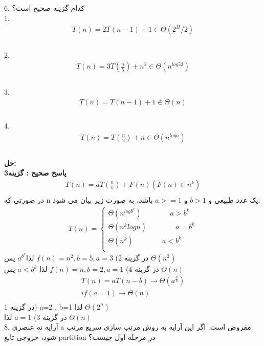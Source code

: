 \documentclass{book}
\begin{document}
6. کدام گزینه صحیح است؟ \\
1.\begin{align*}
T(n) =2T(n-1) + 1 \in \Theta (2^{\Pi}/2) \\
    \end{align*}
    \\
2.\begin{align*}
T(n) =3T(\frac{n}{5}) + n^2 \in \Theta (n^{log53}) \\
\end{align*}
\\
3.\begin{align*}
T(n) =T(n-1) + 1 \in \Theta (n) \\
\end{align*}
\\
4.\begin{align*}
T(n) =T(\frac{n}{2}) + n \in \Theta (n^{log n}) \\
\end{align*}
\\
\textbf{حل:}\\
\textbf{پاسخ صحیح : گزینه3}\\
\begin{align*}
T(n)=aT(\frac{n}{b})+F(n) (F(n) \in n^k)\\
\end{align*}
در صورتی که n یک عدد طبیعی و $b>1$ و $a>=1$ باشد، به صورت زیر بیان می شود:\\
\begin{align*}
T(n) =\begin{cases}
\Theta (n^{log b^a}) \quad\quad\quad\quad a > b^k\\
\Theta (n^k log n) \quad\quad\quad\quad a = b^k\\
\Theta (n^k) \quad\quad\quad\quad a < b^k\\
\end{cases}
\end{align*}
در گزینه 2) $f(n)=n^2, b=5,a=3$  لذا$a^b^k$ پس $\Theta (n^2)$\\
در گزینه 4) $f(n)=n , b=2,a=1$ لذا $a<b^k$ پس $\Theta (n)$\\
\begin{align*}
T(n)=aT(n-b)  \rightarrow \Theta (a^{\frac{n}{b}}) \\
if (a=1) \rightarrow \Theta (n) \\
\end{align*}
در گزینه 1) a=2 , b=1 لذا $\Theta(2^n)$\\ 
در گزینه 3) 
$a=1$ لذا $\Theta(n)$\\
8. آرایه نه عنصری a مفروض است. اگر این آرایه به روش مرتب سازی سریع مرتب شود، خروجی تابع partition در مرحله اول چیست؟\\
\end{document}
